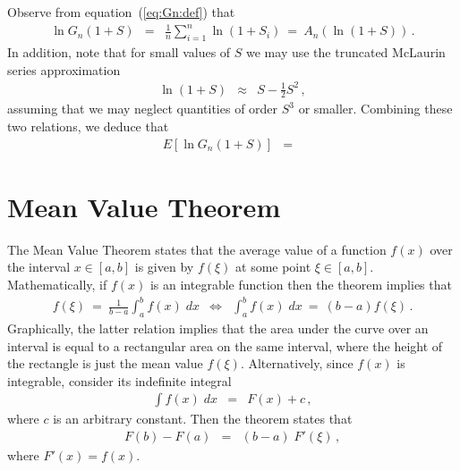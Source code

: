 \documentclass[a4paper]{article}
\begin{document}
Observe from equation~(\ref{eq:Gn:def}) that
\begin{eqnarray}
\ln G_n(1+S) & = &
\frac{1}{n}\sum_{i=1}^{n}\ln (1+S_i)~=~A_n(\ln(1+S))\,.
\end{eqnarray}
In addition, note that for small values of $S$ we may use the truncated
McLaurin series approximation
\begin{eqnarray}
\ln(1+S) & \approx & S-\frac{1}{2}S^2\,,
\end{eqnarray}
assuming that we may neglect quantities of order $S^3$ or smaller.
Combining these two relations, we deduce that
\begin{eqnarray}
E[\ln G_n(1+S)] & = &
\end{eqnarray}


\appendix
\section{Mean Value Theorem}
\label{sec:mean-value-theorem}
The Mean Value Theorem states that the average value of a function
$f(x)$ over the interval $x\in[a,b]$ is given by $f(\xi)$ at some
point $\xi\in[a,b]$.
Mathematically, if $f(x)$ is an integrable function
then the theorem implies that
\begin{eqnarray}
f(\xi)~=~\frac{1}{b-a}\int_{a}^{b}f(x)\;dx
& \Leftrightarrow &
\int_{a}^{b}f(x)\;dx~=~(b-a)f(\xi)\,.
\label{eq:mean-value-theorem}
\end{eqnarray}
Graphically, the latter relation implies that
the area under the curve over an interval
is equal to a rectangular area on the same interval,
where the height of the rectangle is just the mean value $f(\xi)$.
Alternatively, since $f(x)$ is integrable, consider its indefinite
integral
\begin{eqnarray*}
\int f(x)\;dx & = & F(x)+c\,,
\end{eqnarray*}
where $c$ is an arbitrary constant.
Then the theorem states that
\begin{eqnarray}
F(b)-F(a) & = & (b-a)\;F'(\xi)\,,
\end{eqnarray}
where $F'(x)=f(x)$.

\end{document}
